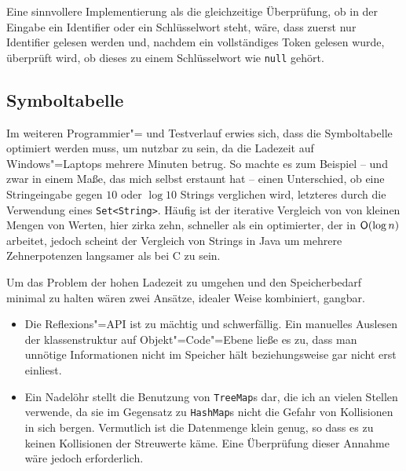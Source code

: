 \documentclass[10pt,a4paper,ngerman,titlepage,tocindentauto]{scrartcl}
\begin{document}
			Eine sinnvollere Implementierung als die gleichzeitige Überprüfung, ob in der Eingabe ein Identifier oder
			ein Schlüsselwort steht, wäre, dass zuerst nur Identifier gelesen werden und, nachdem ein vollständiges
			Token gelesen wurde, überprüft wird, ob dieses zu einem Schlüsselwort wie \texttt{null} gehört.
	
		\subsection[Symboltabelle]{\hypertarget{Offene_Baustellen_Symboltabelle}{Symboltabelle}}
			Im weiteren Programmier"= und Testverlauf erwies sich, dass die Symboltabelle optimiert werden muss, um
			nutzbar zu sein, da die Ladezeit auf Windows"=Laptops mehrere Minuten betrug. So machte es zum Beispiel -- und zwar in einem Maße,
			das mich selbst erstaunt hat -- einen Unterschied, ob eine Stringeingabe gegen $10$ oder $\log 10$ Strings verglichen
			wird, letzteres durch die Verwendung eines \verb|Set<String>|. Häufig ist der iterative Vergleich von von kleinen
			Mengen von Werten, hier zirka zehn, schneller als ein optimierter, der in $\textsf O\!\left(\log n\right)$ arbeitet,
			jedoch scheint der Vergleich von Strings in Java um mehrere Zehnerpotenzen langsamer als bei C zu sein.
			
			Um das Problem der hohen Ladezeit zu umgehen und den Speicherbedarf minimal zu halten wären zwei Ansätze,
			idealer Weise kombiniert, gangbar.
			\begin{itemize}
				\item
					Die Reflexions"=API ist zu mächtig und schwerfällig. Ein manuelles Auslesen der klassenstruktur
					auf Objekt"=Code"=Ebene ließe es zu, dass man unnötige Informationen nicht im Speicher hält beziehungsweise
					gar nicht erst einliest.
				\item
					Ein Nadelöhr stellt die
					Benutzung von \texttt{TreeMap}s dar, die ich an vielen Stellen verwende, da sie im Gegensatz zu \texttt{HashMap}s
					nicht die Gefahr von Kollisionen in sich bergen. Vermutlich ist die Datenmenge klein genug, so dass es zu keinen
					Kollisionen der Streuwerte käme. Eine Überprüfung dieser Annahme wäre jedoch erforderlich.
			\end{itemize}
	
\end{document}
